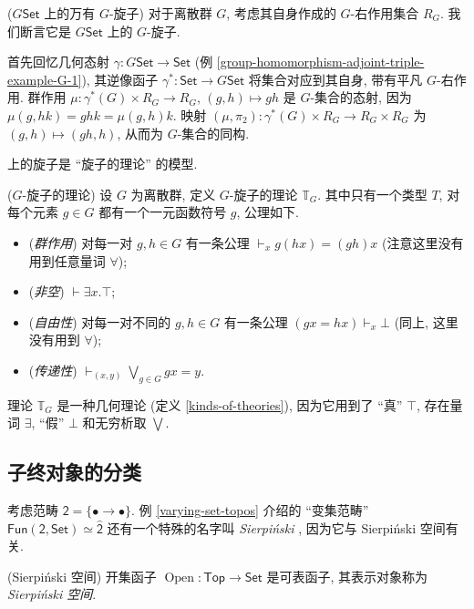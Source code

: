 \begin{example}
	{($G\mathsf {Set}$ 上的万有 $G$-旋子)}
	对于离散群 $G$, 考虑其自身作成的 $G$-右作用集合 $R_G$. 我们断言它是 $G\mathsf {Set}$ 上的 $G$-旋子.
	
	首先回忆几何态射 $\gamma\colon G\mathsf {Set} \to \mathsf {Set}$ (例 \ref{group-homomorphism-adjoint-triple-example-G-1}),
	其逆像函子 $\gamma^*\colon \mathsf {Set} \to G\mathsf {Set}$
	将集合对应到其自身, 带有平凡 $G$-右作用.
	群作用 $\mu\colon \gamma^*(G)\times R_G \to R_G$, $(g,h)\mapsto gh$ 是 $G$-集合的态射, 因为 $\mu(g,hk)=ghk=\mu(g,h)k$.
	映射 $(\mu,\pi_2)\colon \gamma^*(G)\times R_G\to R_G\times R_G$ 为 $(g,h)\mapsto (gh,h)$, 从而为 $G$-集合的同构.
\end{example}

\topos{}上的旋子是 ``旋子的理论'' 的模型.

\begin{definition}
	{($G$-旋子的理论)}
	设 $G$ 为离散群, 定义 $G$-旋子的理论 $\mathbb T_G$.
	其中只有一个类型 $T$, 对每个元素 $g\in G$ 都有一个一元函数符号 $g$, 公理如下.
	\begin{itemize}
		\item (\emph{群作用}) 对每一对 $g,h\in G$ 有一条公理 $\vdash_x g(hx)=(gh)x$ (注意这里没有用到任意量词 $\forall$);
		\item (\emph{非空}) $\vdash \exists x. \top$;
		\item (\emph{自由性}) 对每一对不同的 $g,h\in G$ 有一条公理 $(gx=hx)\vdash_x \bot$ (同上, 这里没有用到 $\forall$);
		\item (\emph{传递性}) $\displaystyle\vdash_{(x,y)}\bigvee_{g\in G}gx=y$.
	\end{itemize}
\end{definition}

理论 $\mathbb T_G$ 是一种几何理论 (定义 \ref{kinds-of-theories}), 因为它用到了 ``真'' $\top$, 存在量词 $\exists$, ``假'' $\bot$ 和无穷析取 $\bigvee$.

\subsection{子终对象的分类\topos}

考虑范畴 $\mathsf 2 = \{\bullet\longrightarrow\bullet\}$. 例 \ref{varying-set-topos} 介绍的 ``变集范畴'' $\mathsf {Fun}(\mathsf {2},\mathsf {Set})\simeq\widehat {\mathsf {2}}$ 还有一个特殊的名字叫 \emph{Sierpi\'nski \topos{}}, 因为它与 Sierpi\'nski 空间有关.

\begin{propdef}
	{(Sierpi\'nski 空间)}
	开集函子 $\operatorname{Open}\colon \mathsf {Top}\to \mathsf {Set}$ 是可表函子, 其表示对象称为 \emph{Sierpi\'nski 空间}.
\end{propdef}

